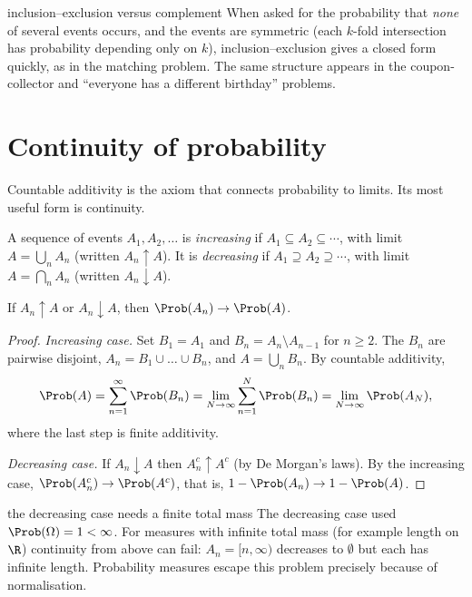 \begin{interview}{inclusion--exclusion versus complement}
When asked for the probability that \emph{none} of several events occurs, and
the events are symmetric (each $k$-fold intersection has probability depending
only on $k$), inclusion--exclusion gives a closed form quickly, as in the
matching problem. The same structure appears in the coupon-collector and
``everyone has a different birthday'' problems.
\end{interview}

\section{Continuity of probability}

Countable additivity is the axiom that connects probability to limits. Its most
useful form is continuity.

\begin{definition}
A sequence of events $A_1,A_2,\dots$ is \emph{increasing} if
$A_1\subseteq A_2\subseteq\cdots$, with limit $A=\bigcup_nA_n$ (written
$A_n\uparrow A$). It is \emph{decreasing} if $A_1\supseteq A_2\supseteq\cdots$,
with limit $A=\bigcap_nA_n$ (written $A_n\downarrow A$).
\end{definition}

\begin{theorem}\label{thm:continuity}
If $A_n\uparrow A$ or $A_n\downarrow A$, then $\Prob(A_n)\to\Prob(A)$.
\end{theorem}
\begin{proof}
\emph{Increasing case.} Set $B_1=A_1$ and $B_n=A_n\setminus A_{n-1}$ for
$n\ge 2$. The $B_n$ are pairwise disjoint, $A_n=B_1\cup\dots\cup B_n$, and
$A=\bigcup_nB_n$. By countable additivity,
\[
\Prob(A)=\sum_{n=1}^\infty\Prob(B_n)=\lim_{N\to\infty}\sum_{n=1}^N\Prob(B_n)
=\lim_{N\to\infty}\Prob(A_N),
\]
where the last step is finite additivity.

\emph{Decreasing case.} If $A_n\downarrow A$ then $A_n^c\uparrow A^c$ (by De
Morgan's laws). By the increasing case, $\Prob(A_n^c)\to\Prob(A^c)$, that is,
$1-\Prob(A_n)\to1-\Prob(A)$.
\end{proof}

\begin{nuance}{the decreasing case needs a finite total mass}
The decreasing case used $\Prob(\Omega)=1<\infty$. For measures with infinite
total mass (for example length on $\R$) continuity from above can fail:
$A_n=[n,\infty)$ decreases to $\emptyset$ but each has infinite length.
Probability measures escape this problem precisely because of normalisation.
\end{nuance}

